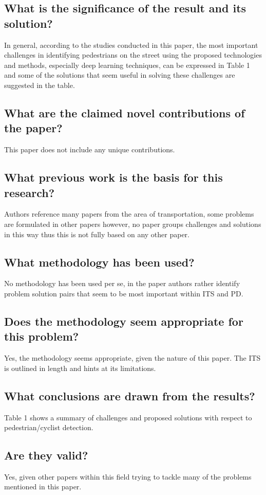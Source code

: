 \documentclass[11pt,a4paper]{article}
\begin{document}
\subsection*{What is the significance of the result and its solution?}
In general, according to the studies conducted in this paper, the most important challenges in identifying pedestrians on the street using the proposed technologies and methods, especially deep learning techniques, can be expressed in Table 1 and some of the solutions that seem useful in solving these challenges are suggested in the table.

\subsection*{What are the claimed novel contributions of the paper?}
This paper does not include any unique contributions.

\subsection*{What previous work is the basis for this research?}
Authors reference many papers from the area of transportation, some problems are formulated in other papers however, no paper groups challenges and solutions in this way thus this is not fully based on any other paper.

\subsection*{What methodology has been used?}
No methodology has been used per se, in the paper authors rather identify problem solution pairs that seem to be most important within ITS and PD.

\subsection*{Does the methodology seem appropriate for this problem?}
Yes, the methodology seems appropriate, given the nature of this paper. The ITS is outlined in length and hints at its limitations.

\subsection*{What conclusions are drawn from the results?}
Table 1 shows a summary of challenges and proposed solutions with respect to pedestrian/cyclist detection.

\subsection*{Are they valid?}
Yes, given other papers within this field trying to tackle many of the problems mentioned in this paper.
\end{document}
